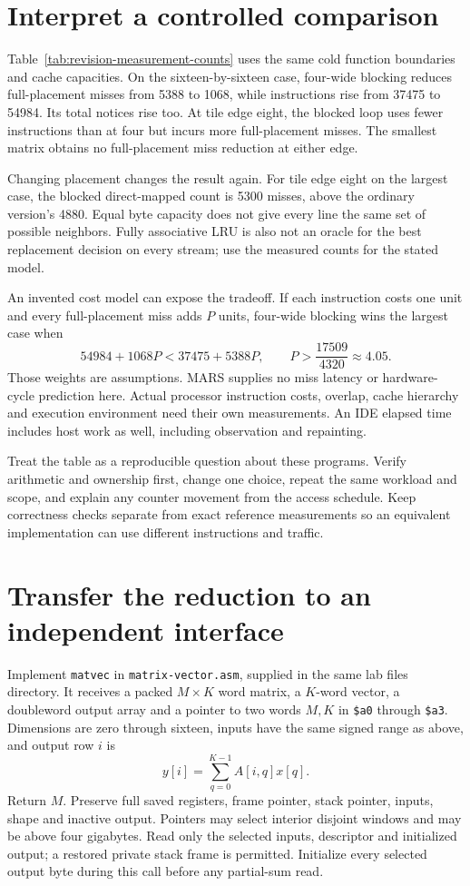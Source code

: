 \section{Interpret a controlled comparison}



Table~\ref{tab:revision-measurement-counts} uses the same cold function boundaries
and cache capacities. On the sixteen-by-sixteen case, four-wide blocking reduces
full-placement misses from 5388 to 1068, while instructions rise from 37475 to
54984. Its total notices rise too. At tile edge eight, the blocked loop uses fewer
instructions than at four but incurs more full-placement misses. The smallest
matrix obtains no full-placement miss reduction at either edge.

Changing placement changes the result again. For tile edge eight on the largest
case, the blocked direct-mapped count is 5300 misses, above the ordinary version's
4880. Equal byte capacity does not give every line the same set of possible
neighbors. Fully associative LRU is also not an oracle for the best replacement
decision on every stream; use the measured counts for the stated model.

An invented cost model can expose the tradeoff. If each instruction costs one
unit and every full-placement miss adds $P$ units, four-wide blocking wins the
largest case when
\[
  54984+1068P<37475+5388P,
  \qquad P>\frac{17509}{4320}\approx4.05.
\]
Those weights are assumptions. MARS supplies no miss latency or hardware-cycle
prediction here. Actual processor instruction costs, overlap, cache hierarchy and
execution environment need their own measurements. An IDE elapsed time includes
host work as well, including observation and repainting.

Treat the table as a reproducible question about these programs. Verify arithmetic
and ownership first, change one choice, repeat the same workload and scope, and
explain any counter movement from the access schedule. Keep correctness checks
separate from exact reference measurements so an equivalent implementation can
use different instructions and traffic.

\section{Transfer the reduction to an independent interface}

Implement \texttt{matvec} in \texttt{matrix-vector.asm}, supplied in the same lab
files directory. It receives a packed $M\times K$ word matrix, a $K$-word vector,
a doubleword output array and a pointer to two words $M,K$ in
\texttt{\$a0} through \texttt{\$a3}. Dimensions are zero through sixteen, inputs
have the same signed range as above, and output row $i$ is
\[
  y[i]=\sum_{q=0}^{K-1} A[i,q]x[q].
\]
Return $M$. Preserve full saved registers, frame pointer, stack pointer, inputs,
shape and inactive output. Pointers may select interior disjoint windows and may
be above four gigabytes. Read only the selected inputs, descriptor and initialized
output; a restored private stack frame is permitted. Initialize every selected
output byte during this call before any partial-sum read.

